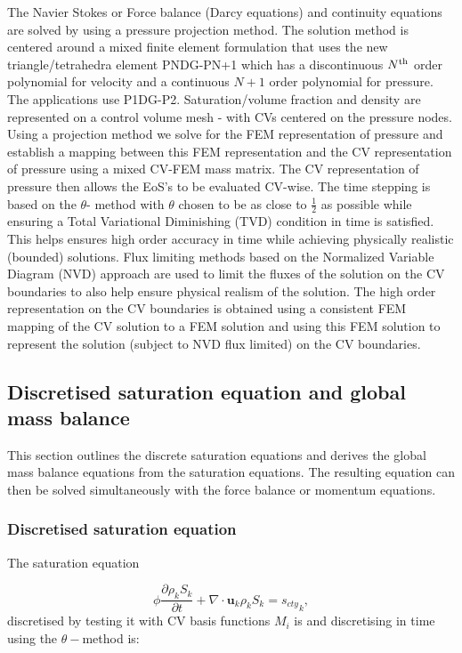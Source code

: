 The Navier Stokes or Force balance (Darcy equations) and continuity
equations are solved by using a pressure projection method.
The solution method is centered around a mixed finite element formulation
that uses the new triangle/tetrahedra element PNDG-PN+1 which has a discontinuous $N^{\rm th}$ order polynomial for velocity and a continuous $N+1$ order polynomial for pressure. The applications use P1DG-P2.
Saturation/volume fraction
and density are represented on a control volume mesh - with CVs centered on the pressure nodes.
Using a projection method we solve for the FEM representation of
pressure and establish a mapping between this FEM representation
and the CV representation of pressure using a mixed CV-FEM mass
matrix. The CV representation of pressure then allows
 the EoS's to be evaluated CV-wise.
The time stepping is based on the $\theta$- method with
$\theta$ chosen to be as close to $\frac{1}{2}$ as possible
while ensuring a Total Variational Diminishing (TVD)
condition in time is satisfied.
This helps ensures high order
accuracy in time while achieving physically realistic (bounded)
solutions. Flux limiting methods based on the Normalized Variable
Diagram (NVD) approach
are used to limit the fluxes of the solution
on the CV boundaries to also
help ensure physical realism of the solution.
The high order representation on the CV boundaries is
obtained using a consistent FEM mapping of the CV
solution to a FEM solution and using this FEM solution
to represent the solution (subject to NVD flux limited) on the CV boundaries.



\subsection{Discretised saturation equation and global mass balance}

This section outlines the discrete saturation equations and derives the global mass balance equations from the saturation equations. The resulting equation can then be solved simultaneously with the force balance or momentum equations.


\subsubsection{Discretised saturation equation}

The saturation equation

\begin{equation}
\phi\frac{\partial \rho_k S_k }{\partial t}
+ \nabla \cdot {\mathbf u}_k \rho_k S_k = {s_{cty}}_k,
\end{equation}
discretised by testing it with CV basis functions
 $M_i$ is and discretising in time using the
 $\theta-$method is:

